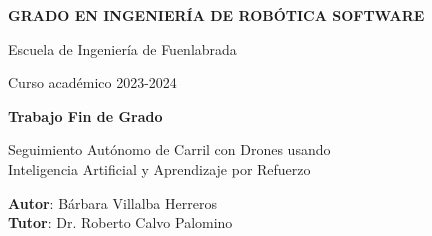 \thispagestyle{empty}
\vspace{2cm}

\begin{figure}[htb]
  \centerline{}
\end{figure}

\begin{center}
  {\Large {\bf GRADO EN INGENIERÍA DE ROBÓTICA SOFTWARE}}
  \vspace{5mm}
 
  {\large {Escuela de Ingeniería de Fuenlabrada}}
  \vspace{5mm}

  {\large {Curso académico 2023-2024}}

  \vspace{1cm}

  {\large {\bf Trabajo Fin de Grado}}

  \vspace{2cm}

  {\Large {Seguimiento Autónomo de Carril con Drones usando\\
          Inteligencia Artificial y Aprendizaje por Refuerzo\\[1cm] }}

  \vspace{5cm}
  {\bf Autor}: Bárbara Villalba Herreros \\
  {\bf Tutor}: Dr. Roberto Calvo Palomino 

\end{center}

\clearpage
\thispagestyle{empty}
